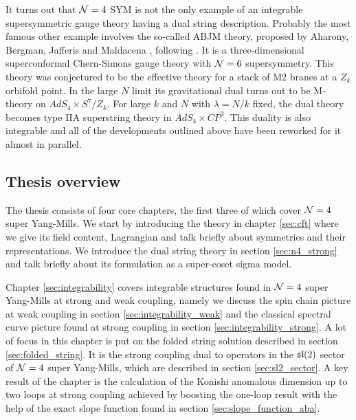 It turns out that $\mathcal{N}=4$ SYM is not the only example of an integrable supersymmetric gauge theory having a dual string description.
Probably the most famous other example involves the so-called ABJM theory, proposed by Aharony, Bergman, Jafferis and Maldacena \cite{Aharony:2008ug}, following \cite{Schwarz:2004yj, Bagger:2006sk,Gustavsson:2007vu,Gaiotto:2007qi}.
It is a three-dimensional superconformal Chern-Simons gauge theory with $\mathcal{N}=6$ supersymmetry.
This theory was conjectured to be the effective theory for a stack of M2 branes at a $Z_k$ orbifold
point. 
In the large $N$ limit its gravitational dual turns out to be M-theory on $AdS_4 \times S^7 / Z_k$. 
For large $k$ and $N$ with $\lambda = N/k$ fixed, the dual theory becomes type IIA superstring theory in $AdS_4 \times CP^3$.
This duality is also integrable \cite{Minahan:2008hf} and all of the developments outlined above have been reworked for it almost in parallel. 

\newpage
\subsection{Thesis overview}

The thesis consists of four core chapters, the first three of which cover $\mathcal{N}=4$ super Yang-Mills.
We start by introducing the theory in chapter \ref{sec:cft} where we give its field content, Lagrangian and talk briefly about symmetries and their representations.
We introduce the dual string theory in section \ref{sec:n4_strong} and talk briefly about its formulation as a super-coset sigma model.

Chapter \ref{sec:integrability} covers integrable structures found in $\mathcal{N}=4$ super Yang-Mills at strong and weak coupling, namely we discuss the spin chain picture at weak coupling in section \ref{sec:integrability_weak} and the classical spectral curve picture found at strong coupling in section \ref{sec:integrability_strong}.
A lot of focus in this chapter is put on the folded string solution described in section \ref{sec:folded_string}. 
It is the strong coupling dual to operators in the $\mathfrak{sl}(2)$ sector of $\mathcal{N}=4$ super Yang-Mills, which are described in section \ref{sec:sl2_sector}. 
A key result of the chapter is the calculation of the Konishi anomalous dimension up to two loops at strong coupling achieved by boosting the one-loop result with the help of the exact slope function found in section \ref{sec:slope_function_aba}.

